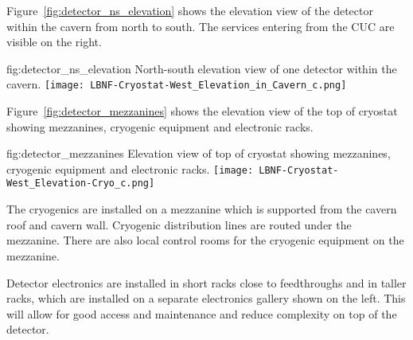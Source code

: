 Figure~\ref{fig:detector_ns_elevation} shows the elevation view of the
detector within the cavern from north to south. The services entering
from the CUC are visible on the right.
\begin{dunefigure}{fig:detector_ns_elevation}
  {North-south elevation view of one detector within the cavern.}
  \texttt{[image: LBNF-Cryostat-West\_Elevation\_in\_Cavern\_c.png]}
\end{dunefigure}

Figure~\ref{fig:detector_mezzanines} shows the elevation view of the
top of cryostat showing mezzanines, cryogenic equipment and electronic
racks.
\begin{dunefigure}{fig:detector_mezzanines}
  {Elevation view of top of cryostat showing mezzanines, cryogenic
    equipment and electronic racks.}
  \texttt{[image: LBNF-Cryostat-West\_Elevation-Cryo\_c.png]}
\end{dunefigure}
The cryogenics are installed on a mezzanine which is supported from
the cavern roof and cavern wall. Cryogenic distribution lines are
routed under the mezzanine. There are also local control rooms for the
cryogenic equipment on the mezzanine.

Detector electronics are installed in short racks close to
feedthroughs and in taller racks, which are installed on a separate
electronics gallery shown on the left. This will allow for good access
and maintenance and reduce complexity on top of the detector.



